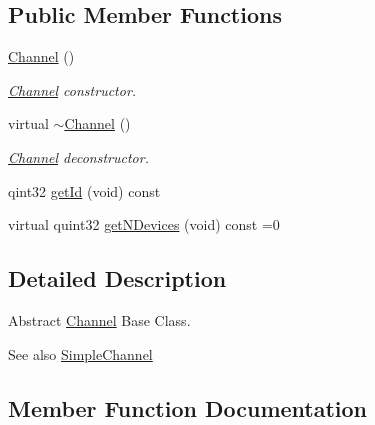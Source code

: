 \subsection*{Public Member Functions}
\begin{DoxyCompactItemize}
\item 
\hyperlink{classChannel_af2b4b16288cbb2c592b1e0f6486c2430}{Channel} ()\hypertarget{classChannel_af2b4b16288cbb2c592b1e0f6486c2430}{}\label{classChannel_af2b4b16288cbb2c592b1e0f6486c2430}

\begin{DoxyCompactList}\small\item\em \hyperlink{classChannel}{Channel} constructor. \end{DoxyCompactList}\item 
virtual \hyperlink{classChannel_af649ff0e4381291b608813b35f998047}{$\sim$\+Channel} ()\hypertarget{classChannel_af649ff0e4381291b608813b35f998047}{}\label{classChannel_af649ff0e4381291b608813b35f998047}

\begin{DoxyCompactList}\small\item\em \hyperlink{classChannel}{Channel} deconstructor. \end{DoxyCompactList}\item 
qint32 \hyperlink{classChannel_af2a456051ae4b3765e4dd01f169c0317}{get\+Id} (void) const 
\item 
virtual quint32 \hyperlink{classChannel_a28065f95665bec4b81c305dbe04d2af4}{get\+N\+Devices} (void) const =0
\end{DoxyCompactItemize}


\subsection{Detailed Description}
Abstract \hyperlink{classChannel}{Channel} Base Class. 

\begin{DoxySeeAlso}{See also}
\hyperlink{classSimpleChannel}{Simple\+Channel} 
\end{DoxySeeAlso}


\subsection{Member Function Documentation}
